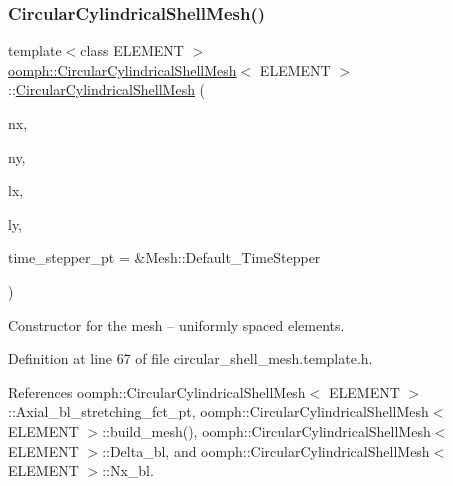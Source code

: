 \subsubsection{\texorpdfstring{Circular\+Cylindrical\+Shell\+Mesh()}{CircularCylindricalShellMesh()}\hspace{0.1cm}{\footnotesize\ttfamily [1/3]}}
{\footnotesize\ttfamily template$<$class E\+L\+E\+M\+E\+NT $>$ \\
\hyperlink{classoomph_1_1CircularCylindricalShellMesh}{oomph\+::\+Circular\+Cylindrical\+Shell\+Mesh}$<$ E\+L\+E\+M\+E\+NT $>$\+::\hyperlink{classoomph_1_1CircularCylindricalShellMesh}{Circular\+Cylindrical\+Shell\+Mesh} (\begin{DoxyParamCaption}\item[{const unsigned \&}]{nx,  }\item[{const unsigned \&}]{ny,  }\item[{const double \&}]{lx,  }\item[{const double \&}]{ly,  }\item[{Time\+Stepper $\ast$}]{time\+\_\+stepper\+\_\+pt = {\ttfamily \&Mesh\+:\+:Default\+\_\+TimeStepper} }\end{DoxyParamCaption})\hspace{0.3cm}{\ttfamily [inline]}}



Constructor for the mesh -- uniformly spaced elements. 



Definition at line 67 of file circular\+\_\+shell\+\_\+mesh.\+template.\+h.



References oomph\+::\+Circular\+Cylindrical\+Shell\+Mesh$<$ E\+L\+E\+M\+E\+N\+T $>$\+::\+Axial\+\_\+bl\+\_\+stretching\+\_\+fct\+\_\+pt, oomph\+::\+Circular\+Cylindrical\+Shell\+Mesh$<$ E\+L\+E\+M\+E\+N\+T $>$\+::build\+\_\+mesh(), oomph\+::\+Circular\+Cylindrical\+Shell\+Mesh$<$ E\+L\+E\+M\+E\+N\+T $>$\+::\+Delta\+\_\+bl, and oomph\+::\+Circular\+Cylindrical\+Shell\+Mesh$<$ E\+L\+E\+M\+E\+N\+T $>$\+::\+Nx\+\_\+bl.

\mbox{\label{classoomph_1_1CircularCylindricalShellMesh_a2382a9ed0cd210c7b697e6ba4f4e2b0b}} 
